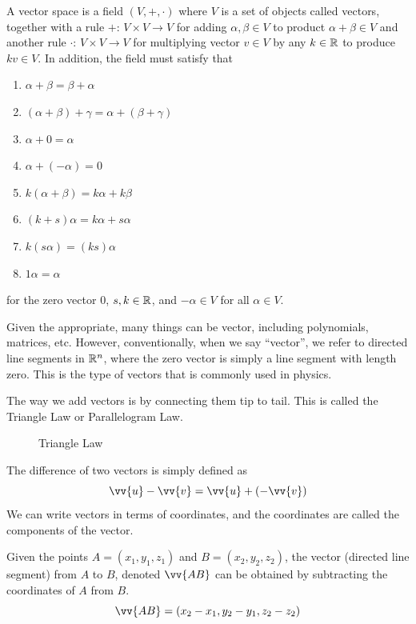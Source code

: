 \begin{definition}
A vector space is a field $(V,+,\cdot)$ where $V$ is a set of objects called vectors, together with a rule $+:\, V\times V\to V$ for adding $\alpha,\beta\in V$ to product $\alpha+\beta\in V$ and another rule $\cdot:\, V\times V\to V$ for multiplying vector $v\in V$ by any $k\in{\mathbb R}$ to produce $kv\in V$. In addition, the field must satisfy that

\begin{multicols}{2}
\begin{enumerate}
    \item $\alpha+\beta = \beta+\alpha$
    \item $(\alpha+\beta)+\gamma = \alpha+(\beta+\gamma)$
    \item $\alpha+0=\alpha$
    \item $\alpha+(-\alpha)=0$
    \item $k(\alpha+\beta)=k\alpha+k\beta$
    \item $(k+s)\alpha=k\alpha+s\alpha$
    \item $k(s\alpha)=(ks)\alpha$
    \item $1\alpha=\alpha$
\end{enumerate}
\end{multicols}
for the zero vector $0$, $s,k\in{\mathbb R}$, and $-\alpha \in V$ for all $\alpha \in V$.
\end{definition}

Given the appropriate, many things can be vector, including polynomials, matrices, etc. However, conventionally, when we say ``vector'', we refer to directed line segments in ${\mathbb R}^n$, where the zero vector is simply a line segment with length zero. This is the type of vectors that is commonly used in physics.

The way we add vectors is by connecting them tip to tail. This is called the Triangle Law or Parallelogram Law.

\begin{figure}[h]
    \centering
    
    \caption{Triangle Law}
\end{figure}

The difference of two vectors is simply defined as
$$
\vv{u}-\vv{v} = \vv{u}+(-\vv{v})
$$
We can write vectors in terms of coordinates, and the coordinates are called the components of the vector.

Given the points $A=(x_1,y_1,z_1)$ and $B=(x_2,y_2,z_2)$, the vector (directed line segment) from $A$ to $B$, denoted $\vv{AB}$ can be obtained by subtracting the coordinates of $A$ from $B$.
$$
\vv{AB}=(x_2-x_1,y_2-y_1,z_2-z_2)
$$

